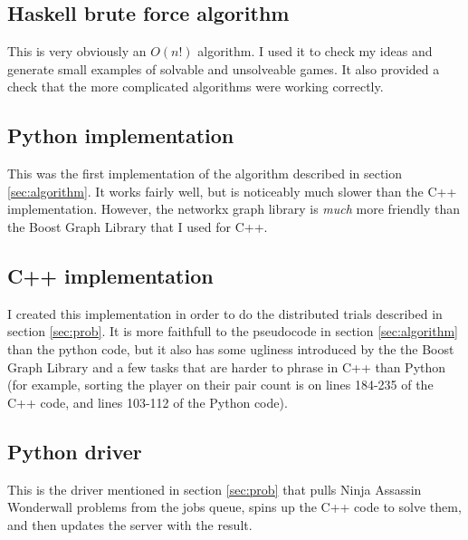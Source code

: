 \documentclass[12pt,x11names, rgb]{article}
\begin{document}
    \subsection{Haskell brute force algorithm}
        This is very obviously an $O(n!)$ algorithm. I used it to check my ideas and generate small examples of solvable and unsolveable games. It also provided a check that the more complicated algorithms were working correctly.
        
    \subsection{Python implementation}
        This was the first implementation of the algorithm described in section \ref{sec:algorithm}. It works fairly well, but is noticeably much slower than the C++ implementation. However, the networkx graph library is \emph{much} more friendly than the Boost Graph Library that I used for C++.
        
    \subsection{C++ implementation}
        I created this implementation in order to do the distributed trials described in section \ref{sec:prob}. It is more faithfull to the pseudocode in section \ref{sec:algorithm} than the python code, but it also has some ugliness introduced by the the Boost Graph Library and a few tasks that are harder to phrase in C++ than Python (for example, sorting the player on their pair count is on lines 184-235 of the C++ code, and lines 103-112 of the Python code).
        
    \subsection{Python driver}
        This is the driver mentioned in section \ref{sec:prob} that pulls Ninja Assassin Wonderwall problems from the jobs queue, spins up the C++ code to solve them, and then updates the server with the result.
        
\end{document}
